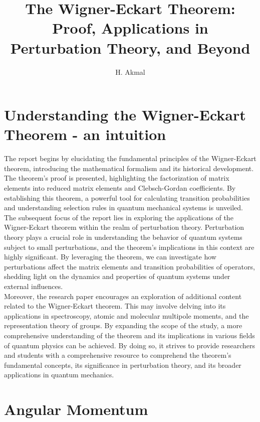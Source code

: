 \documentclass[a4paper,11pt]{article}
\title{\boldmath The Wigner-Eckart Theorem: Proof, Applications in Perturbation Theory, and Beyond}
\author[1]{H. Akmal}
\affiliation{PHY-312, Department of Physics, SBASSE, LUMS.}
\begin{document}
\maketitle
\flushbottom
{}
\newpage
\section{Understanding the Wigner-Eckart Theorem - an intuition}
\label{sec:intro}


The report begins by elucidating the fundamental principles of the Wigner-Eckart theorem, introducing the mathematical formalism and its historical development. The theorem's proof is presented, highlighting the factorization of matrix elements into reduced matrix elements and Clebsch-Gordan coefficients. By establishing this theorem, a powerful tool for calculating transition probabilities and understanding selection rules in quantum mechanical systems is unveiled.
\\

The subsequent focus of the report lies in exploring the applications of the Wigner-Eckart theorem within the realm of perturbation theory. Perturbation theory plays a crucial role in understanding the behavior of quantum systems subject to small perturbations, and the theorem's implications in this context are highly significant. By leveraging the theorem, we can investigate how perturbations affect the matrix elements and transition probabilities of operators, shedding light on the dynamics and properties of quantum systems under external influences.
\\

Moreover, the research paper encourages an exploration of additional content related to the Wigner-Eckart theorem. This may involve delving into its applications in spectroscopy, atomic and molecular multipole moments, and the representation theory of groups. By expanding the scope of the study, a more comprehensive understanding of the theorem and its implications in various fields of quantum physics can be achieved.  By doing so, it strives to provide researchers and students with a comprehensive resource to comprehend the theorem's fundamental concepts, its significance in perturbation theory, and its broader applications in quantum mechanics.
\\

\section{Angular Momentum}
\end{document}
